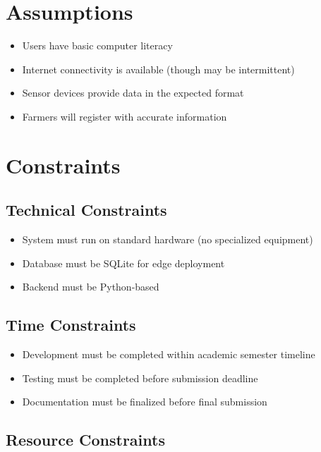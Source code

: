 \section{Assumptions}

\begin{itemize}
    \item Users have basic computer literacy
    \item Internet connectivity is available (though may be intermittent)
    \item Sensor devices provide data in the expected format
    \item Farmers will register with accurate information
\end{itemize}

\section{Constraints}

\subsection{Technical Constraints}

\begin{itemize}
    \item System must run on standard hardware (no specialized equipment)
    \item Database must be SQLite for edge deployment
    \item Backend must be Python-based
\end{itemize}

\subsection{Time Constraints}

\begin{itemize}
    \item Development must be completed within academic semester timeline
    \item Testing must be completed before submission deadline
    \item Documentation must be finalized before final submission
\end{itemize}

\subsection{Resource Constraints}

